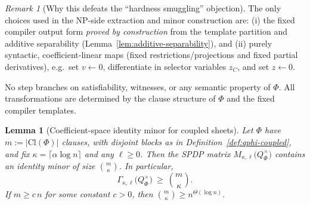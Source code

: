 \documentclass[12pt]{article}
\newtheorem{lemma}[theorem]{Lemma}
\theoremstyle{definition}
\theoremstyle{definition}
\theoremstyle{remark}
\newtheorem{remark}{Remark}
\theoremstyle{remark}
\begin{document}
\begin{remark}[Why this defeats the ``hardness smuggling'' objection]
\label{rem:no-hardness-smuggling}
The only choices used in the NP-side extraction and minor construction are:
(i) the fixed compiler output form \emph{proved by construction} from the template
partition and additive separability (Lemma~\ref{lem:additive-separability}), and
(ii) purely syntactic, coefficient-linear maps (fixed restrictions/projections and fixed
partial derivatives), e.g.\ set $v\leftarrow 0$, differentiate in selector variables $z_C$,
and set $z\leftarrow 0$.

No step branches on satisfiability, witnesses, or any semantic property of $\Phi$.
All transformations are determined by the clause structure of $\Phi$ and the fixed
compiler templates.
\end{remark}


\begin{lemma}[Coefficient-space identity minor for coupled sheets]\label{lem:coef-identity-minor-coupled}
Let $\Phi$ have $m:=|\mathrm{Cl}(\Phi)|$ clauses, with disjoint blocks as in
Definition~\ref{def:qphi-coupled}, and fix $\kappa=\lceil \alpha\log n\rceil$ and any $\ell\ge 0$.
Then the SPDP matrix $M_{\kappa,\ell}\!\bigl(Q_\Phi^{\times}\bigr)$ contains an identity minor of
size $\binom{m}{\kappa}$. In particular,
\[
\Gamma_{\kappa,\ell}\!\bigl(Q_\Phi^{\times}\bigr)\ \ge\ \binom{m}{\kappa}.
\]
If $m\ge c\,n$ for some constant $c>0$, then $\binom{m}{\kappa}\ge n^{\Theta(\log n)}$.
\end{lemma}
\end{document}

